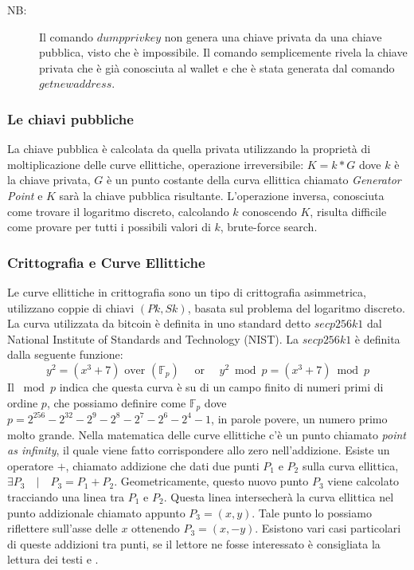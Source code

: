 \begin{description}
	\item[NB:] Il comando $dumpprivkey$ non genera una chiave privata da una chiave pubblica, visto che è impossibile. Il comando semplicemente rivela la chiave privata che è già conosciuta al wallet e che è stata generata dal comando $getnewaddress$.
\end{description}

\subsubsection{Le chiavi pubbliche}
La chiave pubblica è calcolata da quella privata utilizzando la proprietà di moltiplicazione delle curve ellittiche, operazione irreversibile: $K=k*G$ dove $k$ è la chiave privata, $G$ è un punto costante della curva ellittica chiamato \textit{Generator Point} e $K$ sarà la chiave pubblica risultante. L'operazione inversa, conosciuta come trovare il logaritmo discreto, calcolando $k$ conoscendo $K$, risulta difficile come provare per tutti i possibili valori di $k$, brute-force search.

\subsubsection{Crittografia e Curve Ellittiche}
Le curve ellittiche in crittografia sono un tipo di crittografia asimmetrica, utilizzano coppie di chiavi $(Pk, Sk)$, basata sul problema del logaritmo discreto. La curva utilizzata da bitcoin è definita in uno standard detto $secp256k1$ dal National Institute of Standards and Technology (NIST). La $secp256k1$ è definita dalla seguente funzione:
\[  y^{2}=(x^{3}+7) \text{ over } (\mathbb{F}_{p}) \quad \text{ or } \quad y^{2} \bmod p=(x^{3}+7) \bmod p\]
Il $\bmod p$ indica che questa curva è su di un campo finito di numeri primi di ordine $p$, che possiamo definire come $\mathbb{F}_{p}$ dove $p = 2^{256} - 2^{32} - 2^{9} - 2^{8} - 2^{7} - 2^{6} - 2^{4} - 1$, in parole povere, un numero primo molto grande.
Nella matematica delle curve ellittiche c'è un punto chiamato \textit{point as infinity}, il quale viene fatto corrispondere allo zero nell'addizione.
Esiste un operatore $+$, chiamato addizione che dati due punti $P_{1}$ e $P_{2}$ sulla curva ellittica, $\exists P_{3} \quad | \quad P_{3} = P_{1} + P_{2}$. Geometricamente, questo nuovo punto $P_{3}$ viene calcolato tracciando una linea tra $P_{1}$ e $P_{2}$. Questa linea intersecherà la curva ellittica nel punto addizionale chiamato appunto $P_{3} = (x, y)$. Tale punto lo possiamo riflettere sull'asse delle $x$ ottenendo $P_{3} = (x, -y)$. Esistono vari casi particolari di queste addizioni tra punti, se il lettore ne fosse interessato è consigliata la lettura dei testi \cite{mastering:andreas} e \cite{mastering2:andreas}.

